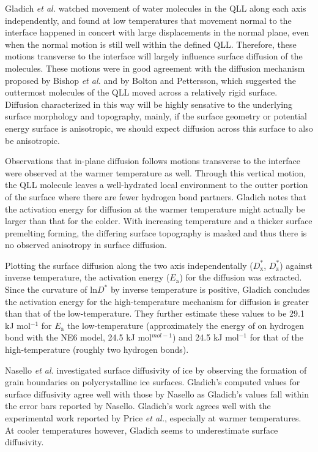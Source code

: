 Gladich \textit{et al.} watched movement of water molecules in the QLL
along each axis independently, and found at low temperatures that
movement normal to the interface happened in concert with large
displacements in the normal plane, even when the normal motion is
still well within the defined QLL. Therefore, these motions transverse
to the interface will largely influence surface diffusion of the
molecules. These motions were in good agreement with the diffusion
mechanism proposed by Bishop \textit{et al.}\cite{Bishop09} and by Bolton
and Pettersson\cite{Bolton00}, which suggested the outtermost molecules of
the QLL moved across a relatively rigid surface. Diffusion
characterized in this way will be highly sensative to the underlying
surface morphology and topography, mainly, if the surface geometry or
potential energy surface is anisotropic, we should expect diffusion
across this surface to also be anisotropic. 

Observations that in-plane diffusion follows motions transverse to the
interface were observed at the warmer temperature as well. Through
this vertical motion, the QLL molecule leaves a well-hydrated local
environment to the outter portion of the surface where there are fewer
hydrogen bond partners. Gladich notes that the activation energy for
diffusion at the warmer temperature might actually be larger than that
for the colder. With increasing temperature and a thicker
surface premelting forming, the differing surface topography is masked
and thus there is no observed anisotropy in surface diffusion.

Plotting the surface diffusion along the two axis independentally
($D^{*}_\mathrm{x}$, $D^{*}_\mathrm{z}$) against inverse temperature,
the activation energy ($E_\mathrm{a}$) for the diffusion was
extracted. Since the curvature of ln$D^{*}$ by inverse temperature is
positive, Gladich concludes the activation energy for the
high-temperature mechanism for diffusion is greater than that of the
low-temperature. They further estimate these values to be 29.1 kJ
mol$^{-1}$ for $E_\mathrm{a}$ the low-temperature (approximately the
energy of on hydrogen bond with the NE6 model, 24.5 kJ mol$^{mol-1}$) and 24.5 kJ
mol$^{-1}$ for that of the high-temperature (roughly two hydrogen bonds). 

Nasello \textit{et al.} investigated surface diffusivity of ice by
observing the formation of grain boundaries on polycrystalline ice
surfaces.\cite{Nasello07} Gladich's computed values for surface diffusivity
agree well with those by Nasello as Gladich's values fall within the
error bars reported by Nasello. Gladich's work agrees well with the
experimental work reported by Price \textit{et al.}\cite{Price99},
especially at warmer temperatures. At cooler temperatures however,
Gladich seems to underestimate surface diffusivity.

